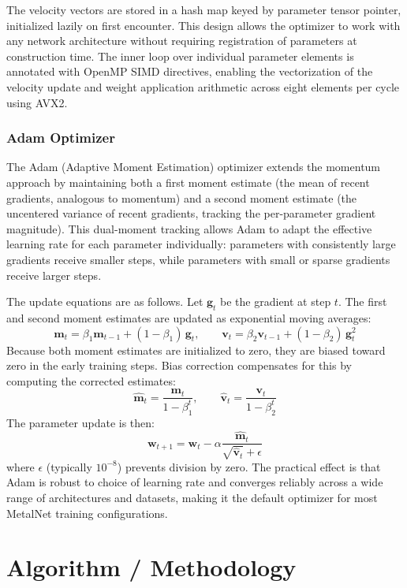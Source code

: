 \documentclass[12pt,oneside,a4paper]{report}
\begin{document}
The velocity vectors are stored in a hash map keyed by parameter tensor pointer, initialized lazily on first encounter. This design allows the optimizer to work with any network architecture without requiring registration of parameters at construction time. The inner loop over individual parameter elements is annotated with OpenMP SIMD directives, enabling the vectorization of the velocity update and weight application arithmetic across eight elements per cycle using AVX2.

\subsubsection{Adam Optimizer}

The Adam (Adaptive Moment Estimation) optimizer extends the momentum approach by maintaining both a first moment estimate (the mean of recent gradients, analogous to momentum) and a second moment estimate (the uncentered variance of recent gradients, tracking the per-parameter gradient magnitude). This dual-moment tracking allows Adam to adapt the effective learning rate for each parameter individually: parameters with consistently large gradients receive smaller steps, while parameters with small or sparse gradients receive larger steps.

The update equations are as follows. Let $\mathbf{g}_t$ be the gradient at step $t$. The first and second moment estimates are updated as exponential moving averages:
$$\mathbf{m}_t = \beta_1 \mathbf{m}_{t-1} + (1-\beta_1)\,\mathbf{g}_t, \qquad \mathbf{v}_t = \beta_2 \mathbf{v}_{t-1} + (1-\beta_2)\,\mathbf{g}_t^2$$
Because both moment estimates are initialized to zero, they are biased toward zero in the early training steps. Bias correction compensates for this by computing the corrected estimates:
$$\hat{\mathbf{m}}_t = \frac{\mathbf{m}_t}{1-\beta_1^t}, \qquad \hat{\mathbf{v}}_t = \frac{\mathbf{v}_t}{1-\beta_2^t}$$
The parameter update is then:
$$\mathbf{w}_{t+1} = \mathbf{w}_t - \alpha \frac{\hat{\mathbf{m}}_t}{\sqrt{\hat{\mathbf{v}}_t} + \epsilon}$$
where $\epsilon$ (typically $10^{-8}$) prevents division by zero. The practical effect is that Adam is robust to choice of learning rate and converges reliably across a wide range of architectures and datasets, making it the default optimizer for most MetalNet training configurations.

\section{Algorithm / Methodology}
\end{document}
